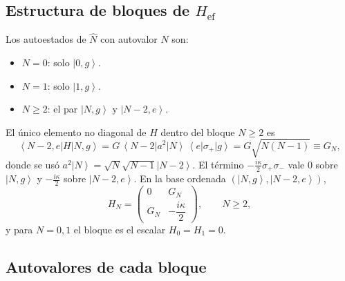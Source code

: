 \documentclass[11pt]{report}
\newcommand{\ket}[1]{\left|#1\right\rangle}
\newcommand{\bra}[1]{\left\langle#1\right|}
\newcommand{\spl}{\sigma_{+}}
\newcommand{\smi}{\sigma_{-}}
\begin{document}
\subsection{Estructura de bloques de $H_{\mathrm{ef}}$}

Los autoestados de $\hat N$ con autovalor $N$ son:
\begin{itemize}
\item $N=0$: solo $\ket{0,g}$.
\item $N=1$: solo $\ket{1,g}$.
\item $N\geq 2$: el par $\ket{N,g}$ y $\ket{N-2,e}$.
\end{itemize}
El \'unico elemento no diagonal de $H$ dentro del bloque $N\geq 2$ es
\begin{equation}
\bra{N-2,e}H\ket{N,g} = G\,\bra{N-2}a^{2}\ket{N}\,\bra{e}\spl\ket{g} = G\sqrt{N(N-1)} \equiv G_{N},
\end{equation}
donde se us\'o $a^{2}\ket{N}=\sqrt{N}\sqrt{N-1}\ket{N-2}$. El t\'ermino $-\tfrac{i\kappa}{2}\spl\smi$ vale $0$ sobre $\ket{N,g}$ y $-\tfrac{i\kappa}{2}$ sobre $\ket{N-2,e}$. En la base ordenada $(\ket{N,g},\ket{N-2,e})$,
\begin{equation}
H_{N} = \begin{pmatrix} 0 & G_{N}\\ G_{N} & -\dfrac{i\kappa}{2}\end{pmatrix},
\qquad N\geq 2,
\label{eq:HN}
\end{equation}
y para $N=0,1$ el bloque es el escalar $H_{0}=H_{1}=0$.

\subsection{Autovalores de cada bloque}
\end{document}
